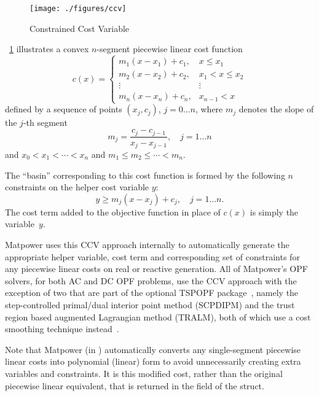 \documentclass[12pt]{article}
\newcommand{\matpower}[0]{{\sc Matpower}}
\newcommand{\code}[1]{{\relsize{-0.5}{\tt{{#1}}}}}  %
\newcommand{\gencost}[0]{\code{gencost}}
\newcommand{\results}[0]{\code{results}}
\numberwithin{equation}{section}
\numberwithin{table}{section}
\numberwithin{figure}{section}
\begin{document}
\begin{figure}[!t]
  \centering
  \texttt{[image: ./figures/ccv]}
  \caption{Constrained Cost Variable}
  \label{fig:ccv}
\end{figure}

\figurename~\ref{fig:ccv} illustrates a convex $n$-segment piecewise linear cost function
\begin{equation}
c(x) = \left\{\begin{array}{cc}
m_1(x - x_1) + c_1, & x \le x_1 \\
m_2(x - x_2) + c_2, & x_1 < x \le x_2 \\
\vdots & \vdots \\
m_n(x - x_n) + c_n, & x_{n-1} < x
\end{array}\right.
\end{equation}
defined by a sequence of points $(x_j, c_j)$, $j = 0 \ldots n$, where $m_j$ denotes the slope of the $j$-th segment
\begin{equation}
m_j = \frac{c_j-c_{j-1}}{x_j-x_{j-1}}, \quad j=1 \ldots n
\end{equation}
and $x_0 < x_1 < \cdots < x_n$ and $m_1 \le m_2 \le \cdots < m_n$.

The ``basin'' corresponding to this cost function is formed by the following $n$ constraints on the helper cost variable $y$:
\begin{equation}
y \ge m_j(x - x_j) + c_j, \quad j=1 \ldots n.
\end{equation}
The cost term added to the objective function in place of $c(x)$ is simply the variable~$y$.

\matpower{} uses this CCV approach internally to automatically generate the appropriate helper variable, cost term and corresponding set of constraints for any piecewise linear costs on real or reactive generation. All of \matpower's OPF solvers, for both AC and DC OPF problems, use the CCV approach with the exception of two that are part of the optional TSPOPF package~\cite{tspopf}, namely the step-controlled primal/dual interior point method (SCPDIPM) and the trust region based augmented Lagrangian method (TRALM), both of which use a cost smoothing technique instead~\cite{wang2007a}.

Note that \matpower{} (in \code{opf\_setup}) automatically converts any single-segment piecewise linear costs into polynomial (linear) form to avoid unnecessarily creating extra variables and constraints. It is this modified cost, rather than the original piecewise linear equivalent, that is returned in the \gencost{} field of the \results{} struct.
\end{document}
